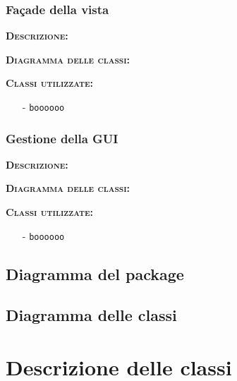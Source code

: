\subsubsection{Façade della vista}
\begin{description}
	\item{\scshape\bfseries Descrizione:} 
	\item{\scshape\bfseries Diagramma delle classi:}
	\item{\scshape\bfseries Classi utilizzate:} 
	\begin{itemize}[noitemsep,nolistsep]
		\item[-] \texttt{boooooo}
	\end{itemize}  
\end{description}

\subsubsection{Gestione della GUI}
\begin{description}
	\item{\scshape\bfseries Descrizione:} 
	\item{\scshape\bfseries Diagramma delle classi:}
	\item{\scshape\bfseries Classi utilizzate:} 
	\begin{itemize}[noitemsep,nolistsep]
		\item[-] \texttt{boooooo}
	\end{itemize}  
\end{description}

\subsection{Diagramma del package}

\subsection{Diagramma delle classi}
\clearpage

\section{Descrizione delle classi}

